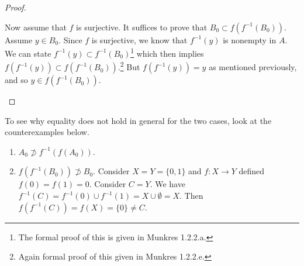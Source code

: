 \begin{proof}
\begin{enumerate}
      Now assume that $f$ is surjective. It suffices to prove that $B_0 \subset f (f^{-1}(B_0))$. Assume $y \in B_0$. Since $f$ is surjective, we know that $f^{-1} (y)$ is nonempty in $A$. We can state $f^{-1}(y) \subset f^{-1} (B_0)$\footnote{The formal proof of this is given in Munkres 1.2.2.a.} which then implies $f(f^{-1} (y)) \subset f (f^{-1} (B_0))$.\footnote{Again formal proof of this given in Munkres 1.2.2.e.} But $f (f^{-1} (y)) = y$ as mentioned previously, and so $y \in f(f^{-1} (B_0))$. 
    \end{enumerate}
  \end{proof}

  \begin{example}[Counterexamples]
    To see why equality does not hold in general for the two cases, look at the counterexamples below. 
    \begin{enumerate}
      \item $A_0 \not\supset f^{-1} (f(A_0))$. 
      \item $f(f^{-1}(B_0)) \not\supset B_0$. Consider $X = Y = \{0, 1\}$ and $f: X \rightarrow Y$ defined $f(0) = f(1) = 0$. Consider $C = Y$. We have $f^{-1} (C) = f^{-1} (0) \cup f^{-1} (1) = X \cup \emptyset = X$. Then $f(f^{-1} (C)) = f(X) = \{0\} \neq C$. 
    \end{enumerate}
  \end{example}

